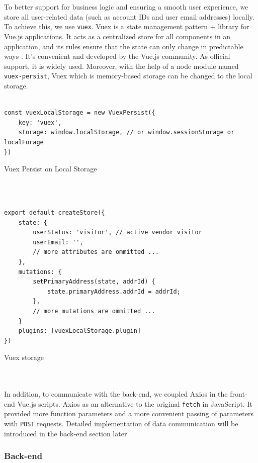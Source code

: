 \documentclass{article}
\begin{document}
\\\\
To better support for business logic and ensuring a smooth user experience, we store all user-related data (such as account IDs and user email addresses) locally. To achieve this, we use \verb|vuex|. Vuex is a state management pattern + library for Vue.js applications. It acts as a centralized store for all components in an application, and its rules ensure that the state can only change in predictable ways \cite{vuex}. It's convenient and developed by the Vue.js community. As official support, it is widely used. Moreover, with the help of a node module named \verb|vuex-persist|, Vuex which is memory-based storage can be changed to the local storage.
\\\\
\begin{listing}[!htp]
\begin{verbatim}
const vuexLocalStorage = new VuexPersist({
    key: 'vuex',
    storage: window.localStorage, // or window.sessionStorage or localForage
})
\end{verbatim}
\caption{Vuex Persist on Local Storage}
\label{listing:vuex-persist}
\end{listing}
\\\\
\begin{listing}[!htp]
\begin{verbatim}
export default createStore({
    state: {
        userStatus: 'visitor', // active vendor visitor
        userEmail: '',
        // more attributes are ommitted ...
    },
    mutations: {
        setPrimaryAddress(state, addrId) {
            state.primaryAddress.addrId = addrId;
        },
        // more mutations are ommitted ...
    }
    plugins: [vuexLocalStorage.plugin]
})
\end{verbatim}
\caption{Vuex storage}
\label{listing:vuex}
\end{listing}
\leavevmode
\\\\
In addition, to communicate with the back-end, we coupled Axios in the front-end Vue.js scripts. Axios as an alternative to the original \verb|fetch| in JavaScript. It provided more function parameters and a more convenient passing of parameters with \verb|POST| requests. Detailed implementation of data communication will be introduced in the back-end section later.

\subsubsection{Back-end}
\end{document}
